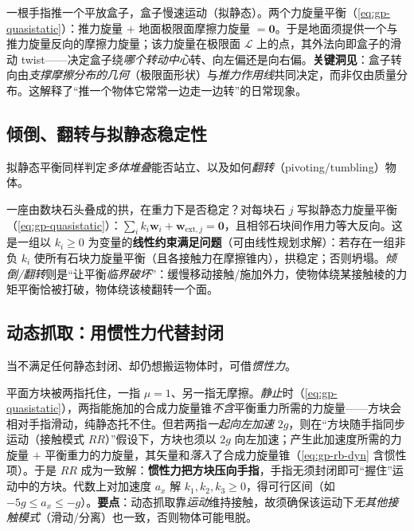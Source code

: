 \begin{example}\label{ex:gp-push}
一根手指推一个平放盒子，盒子慢速运动（拟静态）。两个力旋量平衡（\cref{eq:gp-quasistatic}）：推力旋量 $+$ 地面极限面摩擦力旋量 $=\mathbf{0}$。于是地面须提供一个与推力旋量反向的摩擦力旋量；该力旋量在极限面 $\mathcal{L}$ 上的点，其外法向即盒子的滑动 twist——决定盒子绕\emph{哪个转动中心}转、向左偏还是向右偏。\textbf{关键洞见}：盒子转向由\emph{支撑摩擦分布的几何}（极限面形状）与\emph{推力作用线}共同决定，而非仅由质量分布。这解释了“推一个物体它常常一边走一边转”的日常现象。
\end{example}

\subsection{倾倒、翻转与拟静态稳定性}
拟静态平衡同样判定\emph{多体堆叠}能否站立、以及如何\emph{翻转}（pivoting/tumbling）物体。

\begin{example}\label{ex:gp-arch}
一座由数块石头叠成的拱，在重力下是否稳定？对每块石 $j$ 写拟静态力旋量平衡（\cref{eq:gp-quasistatic}）：$\sum_{i}k_i\mathbf{w}_i+\mathbf{w}_{\text{ext},j}=\mathbf{0}$，且相邻石块间作用力等大反向。这是一组以 $k_i\ge 0$ 为变量的\textbf{线性约束满足问题}（可由线性规划求解）：若存在一组非负 $k_i$ 使所有石块力旋量平衡（且各接触力在摩擦锥内），拱稳定；否则坍塌。\emph{倾倒/翻转}则是“让平衡\emph{临界破坏}”：缓慢移动接触/施加外力，使物体绕某接触棱的力矩平衡恰被打破，物体绕该棱翻转一个面。
\end{example}

\subsection{动态抓取：用惯性力代替封闭}
当不满足任何静态封闭、却仍想搬运物体时，可借\emph{惯性力}。

\begin{example}\label{ex:gp-dynamic}
平面方块被两指托住，一指 $\mu=1$、另一指无摩擦。\emph{静止}时（\cref{eq:gp-quasistatic}），两指能施加的合成力旋量锥\emph{不含}平衡重力所需的力旋量——方块会相对手指滑动，纯静态托不住。但若两指\emph{一起向左加速} $2g$，则在“方块随手指同步运动（接触模式 $RR$）”假设下，方块也须以 $2g$ 向左加速；产生此加速度所需的力旋量 $+$ 平衡重力的力旋量，其矢量和\emph{落入}了合成力旋量锥（\cref{eq:gp-rb-dyn} 含惯性项）。于是 $RR$ 成为一致解：\textbf{惯性力把方块压向手指}，手指无须封闭即可“握住”运动中的方块。代数上对加速度 $a_x$ 解 $k_1,k_2,k_3\ge 0$，得可行区间（如 $-5g\le a_x\le -g$）。\textbf{要点}：动态抓取靠\emph{运动}维持接触，故须确保该运动下\emph{无其他接触模式}（滑动/分离）也一致，否则物体可能甩脱。
\end{example}

